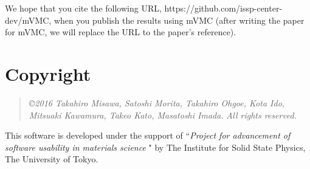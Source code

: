 We hope that you cite the following URL, https://github.com/issp-center-dev/mVMC,  when you publish the results using mVMC (after writing the paper for mVMC, we will replace the URL to the paper's reference).

\section{Copyright}
\begin{quote}
{\it \copyright 2016 Takahiro Misawa, Satoshi Morita, Takahiro Ohgoe, Kota Ido, Mitsuaki Kawamura, Takeo Kato, Masatoshi Imada.} {\it  All rights reserved.}
\end{quote}
This software is developed under the support of ``{\it Project for advancement of software usability in materials science }" by The Institute for Solid State Physics, The University of Tokyo. 

